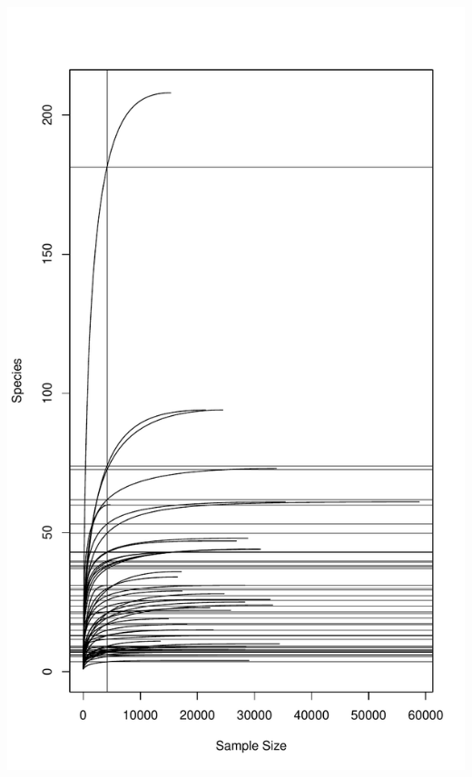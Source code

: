 \documentclass[
]{article}
\begin{document}
\includegraphics[width=1\linewidth]{manuscript_template_files/figure-latex/unnamed-chunk-20-4}
\end{document}
